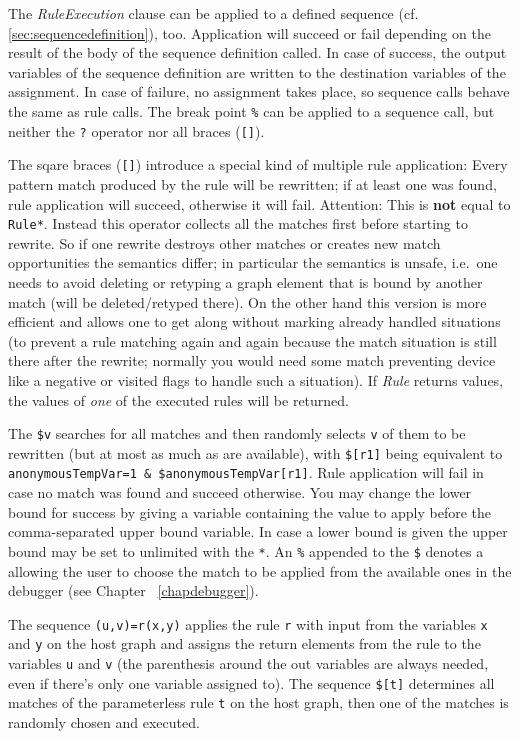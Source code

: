 The \emph{RuleExecution} clause can be applied to a defined sequence (cf. \ref{sec:sequencedefinition}), too.
Application will succeed or fail depending on the result of the body of the sequence definition called.
In case of success, the output variables of the sequence definition are written to the destination variables of the assignment. In case of failure, no assignment takes place, so sequence calls behave the same as rule calls.
The break point \texttt{\%} can be applied to a sequence call, but neither the \texttt{?} operator nor all braces (\texttt{[]}).

The sqare braces (\texttt{[]}) introduce a special kind of multiple rule application:
Every pattern match produced by the rule will be rewritten;
if at least one was found, rule application will succeed, otherwise it will fail. 
Attention: This  is \textbf{not} equal to \texttt{Rule*}.
Instead this operator collects all the matches first before starting to rewrite.
So if one rewrite destroys other matches or creates new match opportunities the semantics differ;
in particular the semantics is unsafe, i.e.\ one needs to avoid deleting or retyping a graph element that is bound by another match (will be deleted/retyped there). On the other hand this version is more efficient and allows one to get along without marking already handled situations (to prevent a rule matching again and again because the match situation is still there after the rewrite; normally you would need some match preventing device like a negative or visited flags to handle such a situation).
If \emph{Rule} returns values, the values of \emph{one} of the executed rules will be returned.

The  \texttt{\$v} searches for all matches and then randomly selects \texttt{v} of them to be rewritten (but at most as much as are available), with \texttt{\$[r1]} being equivalent to \texttt{anonymousTempVar=1 \& \$anonymousTempVar[r1]}.
Rule application will fail in case no match was found and succeed otherwise. 
You may change the lower bound for success by giving a variable containing the value to apply before the comma-separated upper bound variable.
In case a lower bound is given the upper bound may be set to unlimited with the \texttt{*}.
An \texttt{\%} appended to the \texttt{\$} denotes a  
allowing the user to choose the match to be applied from the available ones in the debugger (see Chapter ~\ref{chapdebugger}).

\begin{example}
The sequence \verb#(u,v)=r(x,y)# applies the rule \texttt{r} with input from the variables \texttt{x} and \texttt{y} on the host graph 
and assigns the return elements from the rule to the variables \texttt{u} and \texttt{v} (the parenthesis around the out variables are always needed, even if there's only one variable assigned to).
The sequence \verb#$[t]# determines all matches of the parameterless rule \texttt{t} on the host graph, then one of the matches is randomly chosen and executed.
\end{example}


